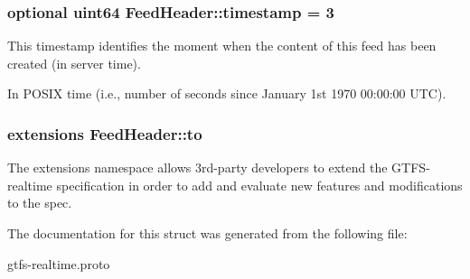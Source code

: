\subsubsection[{\texorpdfstring{timestamp}{timestamp}}]{\setlength{\rightskip}{0pt plus 5cm}optional uint64 Feed\+Header\+::timestamp = 3}\hypertarget{structFeedHeader_ad49340967af0c1b646b59f918dc3325a}{}\label{structFeedHeader_ad49340967af0c1b646b59f918dc3325a}


This timestamp identifies the moment when the content of this feed has been created (in server time). 

In P\+O\+S\+IX time (i.\+e., number of seconds since January 1st 1970 00\+:00\+:00 U\+TC). 
\subsubsection[{\texorpdfstring{to}{to}}]{\setlength{\rightskip}{0pt plus 5cm}extensions Feed\+Header\+::to}\hypertarget{structFeedHeader_a83d02812036b0fcdcb2c2a60f63d0547}{}\label{structFeedHeader_a83d02812036b0fcdcb2c2a60f63d0547}


The extensions namespace allows 3rd-\/party developers to extend the G\+T\+F\+S-\/realtime specification in order to add and evaluate new features and modifications to the spec. 



The documentation for this struct was generated from the following file\+:\begin{DoxyCompactItemize}
\item 
gtfs-\/realtime.\+proto\end{DoxyCompactItemize}
